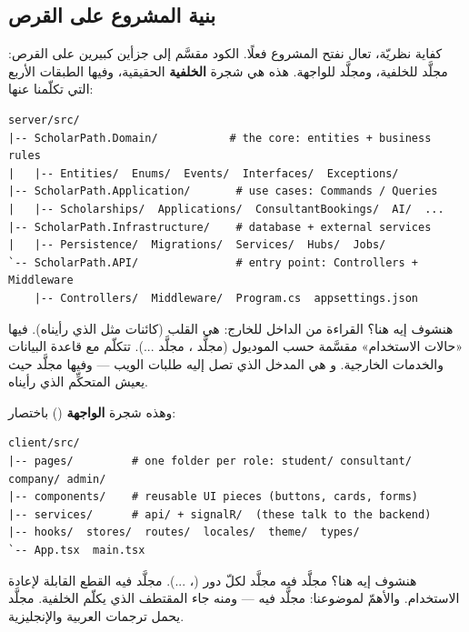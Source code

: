 \subsection{بنية المشروع على القرص}

كفاية نظريّة، تعال نفتح المشروع فعلًا. الكود مقسَّم إلى جزأين كبيرين على القرص:
مجلَّد  للخلفية، ومجلَّد  للواجهة. هذه هي شجرة \textbf{الخلفية}
الحقيقية، وفيها الطبقات الأربع التي تكلّمنا عنها:

\begin{english}
\begin{lstlisting}[language={}]
server/src/
|-- ScholarPath.Domain/           # the core: entities + business rules
|   |-- Entities/  Enums/  Events/  Interfaces/  Exceptions/
|-- ScholarPath.Application/       # use cases: Commands / Queries
|   |-- Scholarships/  Applications/  ConsultantBookings/  AI/  ...
|-- ScholarPath.Infrastructure/    # database + external services
|   |-- Persistence/  Migrations/  Services/  Hubs/  Jobs/
`-- ScholarPath.API/               # entry point: Controllers + Middleware
    |-- Controllers/  Middleware/  Program.cs  appsettings.json
\end{lstlisting}
\end{english}

هنشوف إيه هنا؟ القراءة من الداخل للخارج:  هي القلب (كائنات مثل
 الذي رأيناه).  فيها «حالات الاستخدام» مقسَّمة حسب
الموديول (مجلَّد ، مجلَّد ...). 
تتكلّم مع قاعدة البيانات والخدمات الخارجية. و هي المدخل الذي تصل إليه طلبات
الويب — وفيها مجلَّد  حيث يعيش المتحكِّم الذي رأيناه.

وهذه شجرة \textbf{الواجهة} () باختصار:

\begin{english}
\begin{lstlisting}[language={}]
client/src/
|-- pages/         # one folder per role: student/ consultant/ company/ admin/
|-- components/    # reusable UI pieces (buttons, cards, forms)
|-- services/      # api/ + signalR/  (these talk to the backend)
|-- hooks/  stores/  routes/  locales/  theme/  types/
`-- App.tsx  main.tsx
\end{lstlisting}
\end{english}

هنشوف إيه هنا؟ مجلَّد  فيه مجلَّد لكلّ دور (، ...).
مجلَّد  فيه القطع القابلة لإعادة الاستخدام. والأهمّ لموضوعنا: مجلَّد
 فيه  — ومنه جاء المقتطف  الذي يكلّم الخلفية.
مجلَّد  يحمل ترجمات العربية والإنجليزية.

